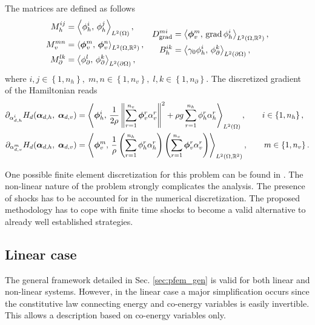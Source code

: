 The matrices are defined as follows 
\begin{equation}
\begin{aligned}
M_h^{ij} &= \inner[L^2(\Omega)]{\phi_h^i}{\phi_h^j}, \\
M_v^{mn} &= \inner[L^2(\Omega, \mathbb{R}^2)]{\bm\phi_v^m}{\bm\phi_v^n}, \\
M_\partial^{lk} &= \inner[L^2(\partial\Omega)]{\phi_\partial^l}{\phi_\partial^k},
\end{aligned}\quad
\begin{aligned}
{D}_{\grad}^{mi} &= \inner[L^2(\Omega, \mathbb{R}^2)]{\bm\phi_v^m}{\grad \phi_h^i}, \\
{B}_{h}^{ik} &= \inner[L^2(\partial\Omega)]{\gamma_0 \phi_h^i}{\phi_\partial^k}, \\
\end{aligned}
\end{equation}
where $i, j \in \left\{1, n_h\right\}, \; m,n \in \left\{1, n_v\right\}, \; l, k \in \left\{1, n_\partial \right\}$. 
The discretized gradient of the Hamiltonian reads
\begin{equation}
\begin{aligned}
\partial_{{\alpha}_{d, h}^i} H_d(\bm{\alpha}_{d, h},\; \bm{\alpha}_{d, v}) &= \inner[L^2(\Omega)]{\bm\phi_h^i}{\frac{1}{2 \rho} \norm{\sum_{r=1}^{n_v} \bm{\phi}_v^r \alpha_v^r}^2 + \rho g \sum_{r=1}^{n_h} {\phi}_h^r \alpha_h^r}, \qquad i \in \left\{1, n_h\right\}, \\
\partial_{{\alpha}_{d, v}^m} H_d(\bm{\alpha}_{d, h},\; \bm{\alpha}_{d, v}) &= \inner[L^2(\Omega, \mathbb{R}^2)]{\bm\phi_v^m}{\frac{1}{\rho} \left(\sum_{r=1}^{n_h} {\phi}_h^r \alpha_h^r\right) \left(\sum_{r=1}^{n_v} \bm{\phi}_v^r \alpha_v^r \right)}, \qquad m \in \left\{1, n_v\right\}.
\end{aligned}
\end{equation}

One possible finite element discretization for this problem can be found in \cite{pironneau1989finite}. The non-linear nature of the problem strongly complicates the analysis. The presence of shocks has to be accounted for in the numerical discretization. The proposed methodology has to cope with finite time shocks to become a valid alternative to already well established strategies.


\subsection{Linear case}\label{sec:linearPfem}
The general framework detailed in Sec. \ref{sec:pfem_gen} is valid for both linear and non-linear systems. However, in the linear case a major simplification occurs since the constitutive law connecting energy and co-energy variables is easily invertible. This allows a description based on co-energy variables only. \\

